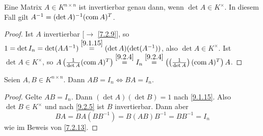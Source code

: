 \documentclass[../../main.tex]{subfiles}
\begin{document}
\begin{kor}\label{9.2.5}
Eine Matrix $A\in K^{n\times n}$ ist invertierbar genau dann, wenn $\det A \in K^{\times}$. In diesem Fall gilt $A^{-1} = (\det A)^{-1}(\operatorname{com} A)^T$.
\end{kor}
\begin{proof}
Ist $A$ invertierbar [$\to$ \ref{7.2.9}], so $1=\det I_n = \det(A A^{-1}) \overset{\ref{9.1.15}}{=} (\det A)(\det (A^{-1}))$, also $\det A\in K^\times$. Ist $\det A\in K^\times$, so $A\left(\frac{1}{\det A}(\operatorname{com} A)^T\right) \overset{\ref{9.2.4}}{=} I_n \overset{\ref{9.2.4}}{=}\left(\left(\frac{1}{\det A}\right)(\operatorname{com} A)^T\right) A$.
\end{proof}

\begin{kor}\label{9.2.6}
Seien $A,B\in K^{n\times n}$. Dann $AB = I_n\iff BA = I_n$.
\end{kor}
\begin{proof}
Gelte $AB = I_n$. Dann $(\det A)(\det B) = 1$ nach \ref{9.1.15}. Also $\det B\in K^\times$ und nach \ref{9.2.5} ist $B$ invertierbar. Dann aber
$$BA = BA(BB^{-1}) = B(AB)B^{-1} = BB^{-1} = I_n$$
wie im Beweis von \ref{7.2.13}.
\end{proof}
\end{document}
